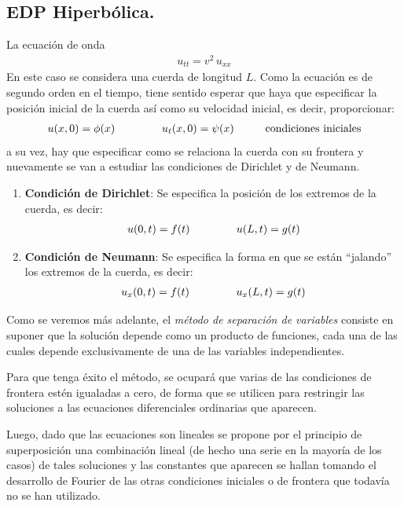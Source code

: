 \subsection{EDP Hiperbólica.}
La ecuación de onda
\begin{align*}
u_{tt} = v^{2} \, u_{xx}
\end{align*}
En este caso se considera una cuerda de longitud $L$. Como la ecuación es de segundo orden en el tiempo, tiene sentido esperar que haya que especificar la posición inicial de la cuerda así como su velocidad inicial, es decir, proporcionar:
\begin{align}
u(x, 0) = \phi (x) \hspace{1.5cm} u_{t}(x, 0) = \psi (x) \hspace{1cm} \mbox{condiciones iniciales}
\label{eq:ecuacion_06_02_07}
\end{align}
a su vez, hay que especificar como se relaciona la cuerda con su frontera y nuevamente se van a estudiar las condiciones de Dirichlet y de Neumann.
\begin{enumerate}
\item \textbf{Condición de Dirichlet}: Se especifica la posición de los extremos de la cuerda, es decir:
\begin{align}
u(0, t) = f (t) \hspace{1.5cm} u(L, t) = g(t)
\label{eq:ecuacion_06_02_08}   
\end{align}
\item \textbf{Condición de Neumann}: Se especifica la forma en que se están \enquote{jalando} los extremos de la cuerda, es decir:
\begin{align}
u_{x}(0, t) = f(t) \hspace{1.5cm} u_{x}(L,t) = g(t)
\label{eq:ecuacion_06_02_09}    
\end{align}
\end{enumerate}
Como se veremos más adelante, el \emph{método de separación de variables} consiste en suponer que la solución depende como un producto de funciones, cada una de las cuales depende exclusivamente de una de las variables independientes.
\par
Para que tenga éxito el método, se ocupará que varias de las condiciones de frontera estén igualadas a cero, de forma que se utilicen para restringir las soluciones a las ecuaciones diferenciales ordinarias que aparecen.
\par
Luego, dado que las ecuaciones son lineales se propone por el principio de superposición una combinación lineal (de hecho una serie en la mayoría de los casos) de tales soluciones y las constantes que aparecen se hallan tomando el desarrollo de Fourier de las otras condiciones iniciales o de frontera que todavía no se han utilizado.

